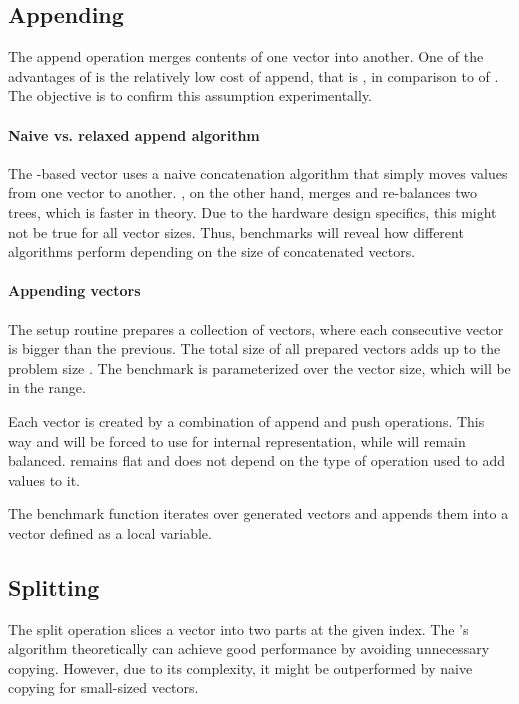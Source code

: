\subsection{Appending}
The append operation merges contents of one vector into another. One of the advantages of \rrbtree{} is the relatively low cost of append, that is , in comparison to  of \stdvec{}. The objective is to confirm this assumption experimentally.

\paragraph{Naive vs. relaxed append algorithm}
The \rbtree{}-based vector uses a naive concatenation algorithm that simply moves values from one vector to another. \rrbtree{}, on the other hand, merges and re-balances two trees, which is faster in theory. Due to the hardware design specifics, this might not be true for all vector sizes. Thus, benchmarks will reveal how different algorithms perform depending on the size of concatenated vectors.

\paragraph{Appending vectors}
The setup routine prepares a collection of vectors, where each consecutive vector is bigger than the previous. The total size of all prepared vectors adds up to the problem size \n{}. The benchmark is parameterized over the vector size, which will be in the \range{[20, \mega{1}]} range.

Each vector is created by a combination of append and push operations. This way \pvec{} and \rrbvec{} will be forced to use \rrbtree{} for internal representation, while \rbvec{} will remain balanced. \stdvec{} remains flat and does not depend on the type of operation used to add values to it.

The benchmark function iterates over generated vectors and appends them into a vector defined as a local variable.

\subsection{Splitting}
The split operation slices a vector into two parts at the given index. The \rrbtree{}'s algorithm theoretically can achieve good performance by avoiding unnecessary copying. However, due to its complexity, it might be outperformed by naive copying for small-sized vectors.

